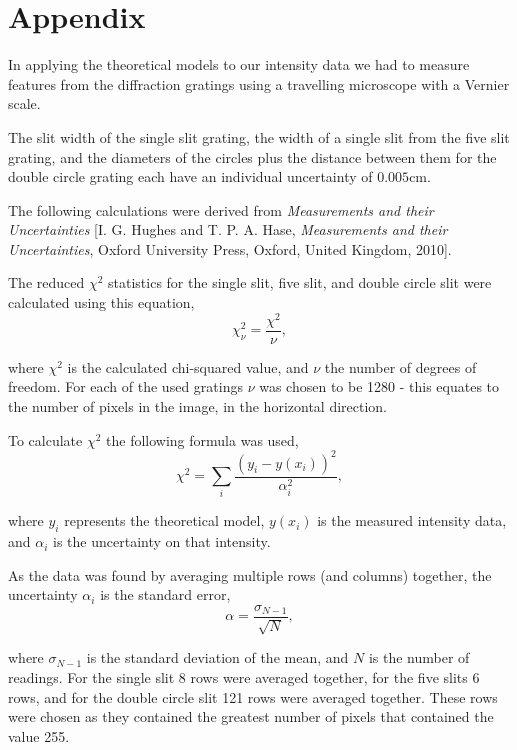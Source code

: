 \documentclass[twocolumn]{revtex4}
\begin{document}
\vfill
\twocolumngrid
\vspace{-3ex}
\section*{Appendix}
\vspace{-2ex}

In applying the theoretical models to our intensity data we had to measure features from the diffraction gratings using a travelling microscope with a Vernier scale. 

The slit width of the single slit grating, the width of a single slit from the five slit grating, and the diameters of the circles plus the distance between them for the double circle grating each have an individual uncertainty of $0.005$cm.

The following calculations were derived from \textit{Measurements and their Uncertainties} [I. G. Hughes and T. P. A. Hase, \textit{Measurements and their Uncertainties}, Oxford University Press, Oxford, United Kingdom, 2010].

The reduced $\chi^2$ statistics for the single slit, five slit, and double circle slit were calculated using this equation,
\begin{equation}
\chi^2_\nu = \frac{\chi^2}{\nu},
\end{equation}

where $\chi^2$ is the calculated chi-squared value, and $\nu$ the number of degrees of freedom. For each of the used gratings $\nu$ was chosen to be 1280 - this equates to the number of pixels in the image, in the horizontal direction.

To calculate $\chi^2$ the following formula was used,
\begin{equation}
\chi^2 = \sum_i \frac{(y_i -y(x_i))^2}{\alpha_i^2},
\end{equation}

where $y_i$ represents the theoretical model, $y(x_i)$ is the measured intensity data, and $\alpha_i$ is the uncertainty on that intensity.

As the data was found by averaging multiple rows (and columns) together, the uncertainty $\alpha_i$ is the standard error,
\begin{equation}
\alpha=\frac{\sigma_{N-1}}{\sqrt{N}},
\end{equation}

where $\sigma_{N-1}$ is the standard deviation of the mean, and $N$ is the number of readings. For the single slit 8 rows were averaged together, for the five slits 6 rows, and for the double circle slit 121 rows were averaged together. These rows were chosen as they contained the greatest number of pixels that contained the value 255. 
\end{document}
